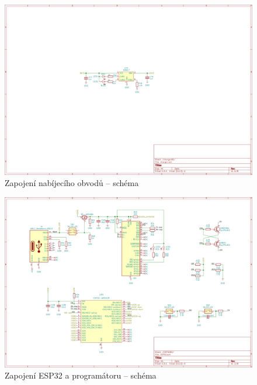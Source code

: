 \begin{figure}
    \centering
    \includegraphics[width=0.93\textheight, angle=90]{kapitoly/ctvrta_elektronicka_varianta/E4_zapojeni/nabijecka.png}
    \caption{Zapojení nabíjecího obvodů -- schéma}
    \label{fig:E4-sch_nabijecka}
\end{figure}
\begin{figure}
    \centering
    \includegraphics[width=0.93\textheight, angle=90]{kapitoly/ctvrta_elektronicka_varianta/E4_zapojeni/ESP32.png}
    \caption{Zapojení ESP32 a programátoru -- schéma}
    \label{fig:E4-sch_ESP32}
\end{figure}
